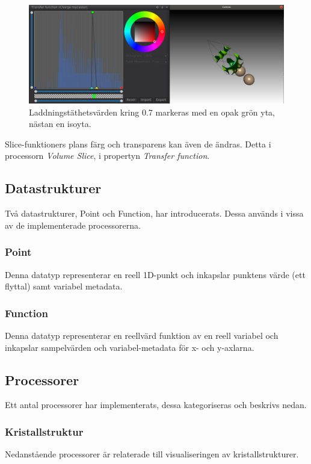 \documentclass[a4paper,12pt]{article}
\begin{document}
\begin{itemize}
\begin{figure} [H]
\centering
\includegraphics[scale=0.4]{screenshot_transfer_function_almostiso.png}
\caption{Laddningstäthetsvärden kring 0.7 markeras med en opak grön yta, nästan en isoyta.}
\label{fig:transfer_function_iso}
\end{figure}

Slice-funktioners plans färg och transparens kan även de ändras. Detta i processorn \textit{Volume Slice}, i propertyn \textit{Transfer function}.

\end{itemize}

\subsection{Datastrukturer}
Två datastrukturer, Point och Function, har introducerats. Dessa används i vissa av de implementerade processorerna.
\subsubsection{Point}
Denna datatyp representerar en reell 1D-punkt och inkapslar punktens värde (ett flyttal) samt variabel metadata.
\subsubsection{Function}
Denna datatyp representerar en reellvärd funktion av en reell variabel och inkapslar sampelvärden och variabel-metadata för x- och y-axlarna.

\subsection{Processorer}
\label{ch:processorer}
Ett antal processorer har implementerats, dessa kategoriseras och beskrivs nedan.

\subsubsection{Kristallstruktur}
\label{ch:kristallstruktur-processorer}
Nedanstående processorer är relaterade till visualiseringen av kristallstrukturer.
\end{document}
